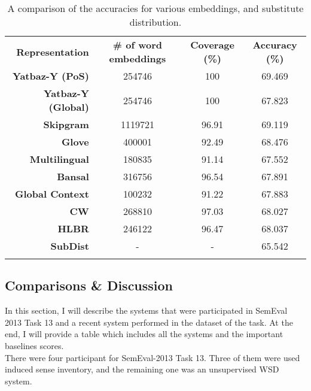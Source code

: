 \begin{table}
\begin{center}
    \begin{tabular}{ r | c | c | c }  \Xhline{2\arrayrulewidth}  
    \bf Representation & \bf \# of word embeddings & \bf Coverage (\%) & \bf Accuracy (\%) \\  \Xhline{2\arrayrulewidth}
    \bf Yatbaz-Y (PoS) & 254746 & 100 & 69.469 \\
    \bf Yatbaz-Y (Global) & 254746 & 100 & 67.823 \\ \hline
    \bf Skipgram & 1119721 & 96.91 & 69.119  \\ 
    \bf Glove & 400001 &  92.49 & 68.476  \\ 
    \bf Multilingual & 180835 & 91.14 & 67.552 \\ 
    \bf Bansal & 316756 & 96.54 & 67.891 \\ 
    \bf Global Context & 100232 & 91.22 & 67.883 \\ 
    \bf CW & 268810 & 97.03 & 68.027 \\ 
    \bf HLBR & 246122 & 96.47 & 68.037 \\ \hline 
    \bf SubDist & - & - & 65.542 \\  \Xhline{2\arrayrulewidth} 
    
    \end{tabular}
\end{center}
    \caption{\label{table:semeval13-svm-baseline} A comparison of the accuracies for various embeddings, and substitute distribution.}
\end{table}


 
\subsection{Comparisons \& Discussion}


In this section, I will describe the systems that were participated in SemEval 2013 Task 13 and a recent system performed in the dataset of the task. At the end, I will provide a table which includes all the systems and the important baselines scores. \\

There were four participant for SemEval-2013 Task 13. Three of them were used induced sense inventory, and the remaining one was an unsupervised WSD system.

